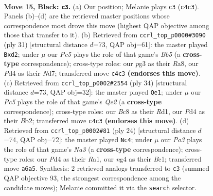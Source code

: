 \documentclass[11pt]{article}
\begin{document}
\clearpage

\begin{figure}[p]\centering
\begin{subfigure}{0.46\textwidth}\centering
\resizebox{\linewidth}{!}{%
\newchessgame
\chessboard[
  setfen={rnbr2k1/1p2bppp/pn1qp3/8/2pp2N1/1P4P1/P2BPPBP/RN1QRK2 b - - 1 15},
  showmover=false,
  pgfstyle=straightmove, color=movearrow, markmove={c4-c3}
]}
\caption{}
\end{subfigure}\hfill
\begin{subfigure}{0.46\textwidth}\centering
\resizebox{\linewidth}{!}{%
\newchessgame
\chessboard[
  setfen={r1b2rk1/1p1nqppp/2p5/p3p3/PbBPN3/1P2P3/2QB1PPP/R4RK1 b - - 2 16},
  showmover=false,
  pgfstyle=straightmove, color=movearrow, markmove={b4-d2}
]}
\caption{}
\end{subfigure}
\\[4pt]
\begin{subfigure}{0.46\textwidth}\centering
\resizebox{\linewidth}{!}{%
\newchessgame
\chessboard[
  setfen={r6r/2p1qpk1/bpn2npp/p1b1p3/4P2N/1PP3PP/PB1NQPB1/R2R2K1 w - - 3 18},
  showmover=false,
  pgfstyle=straightmove, color=movearrow, markmove={e2-e1}
]}
\caption{}
\end{subfigure}\hfill
\begin{subfigure}{0.46\textwidth}\centering
\resizebox{\linewidth}{!}{%
\newchessgame
\chessboard[
  setfen={rn1q1rk1/1pp1p1bp/1n3pp1/4Pb2/p2P4/N1P2N2/PP2B1PP/R1BQ1RK1 w - - 0 13},
  showmover=false,
  pgfstyle=straightmove, color=movearrow, markmove={a3-c4}
]}
\caption{}
\end{subfigure}
\caption{\textbf{Move 15, Black: \texttt{c3}.} (a) Our position; Melanie plays \texttt{c3} (\texttt{c4c3}). Panels (b)--(d) are the retrieved master positions whose correspondence most drove this move (highest QAP objective among those that transfer to it). (b) Retrieved from \texttt{ccrl\_top\_p0000\#3090} (ply 31) [structural distance $d$=73, QAP obj=61]: the master played \texttt{Bxd2}; under $\mu$ our \emph{Pc5} plays the role of that game's \emph{Bb5} (a \textbf{cross-type} correspondence); cross-type roles: our \emph{p}g3 as their \emph{R}a8, our \emph{P}d4 as their \emph{N}d7; transferred move \texttt{c4c3} \textbf{(endorses this move)}. (c) Retrieved from \texttt{ccrl\_top\_p0002\#2554} (ply 34) [structural distance $d$=73, QAP obj=32]: the master played \texttt{Qe1}; under $\mu$ our \emph{Pc5} plays the role of that game's \emph{Qe2} (a \textbf{cross-type} correspondence); cross-type roles: our \emph{B}c8 as their \emph{R}d1, our \emph{P}d4 as their \emph{B}b2; transferred move \texttt{c4c3} \textbf{(endorses this move)}. (d) Retrieved from \texttt{ccrl\_top\_p0002\#81} (ply 24) [structural distance $d$=74, QAP obj=72]: the master played \texttt{Nc4}; under $\mu$ our \emph{Pa3} plays the role of that game's \emph{Na3} (a \textbf{cross-type} correspondence); cross-type roles: our \emph{P}d4 as their \emph{R}a1, our \emph{n}g4 as their \emph{B}c1; transferred move \texttt{a6a5}. Synthesis: 2 retrieved analogs transferred to \texttt{c3} (summed QAP objective 93, the strongest correspondence among the candidate moves); Melanie committed it via the \texttt{search} selector.}
\label{fig:thought-m29}
\end{figure}
\end{document}
